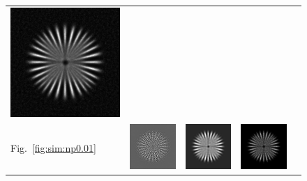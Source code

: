 \documentclass{./packages/optica-article}
\begin{document}
\begin{figure}
\begin{tabular}[t]{l c c c c}
		\includegraphics[scale=0.25]{Simulation deconvolution/ref_ng_0.01/RL_50.png}
		\\
		Fig.~\ref{fig:sim:np0.01}                                                       &
		\includegraphics[scale=0.25]{Simulation deconvolution/ref_np_0.01/RIF_0.01.png} &
		\includegraphics[scale=0.25]{Simulation deconvolution/ref_np_0.01/RIF_1.png}    &
		\includegraphics[scale=0.25]{Simulation deconvolution/ref_np_0.01/RL_10.png}    &

\end{tabular}
\end{figure}
\end{document}
